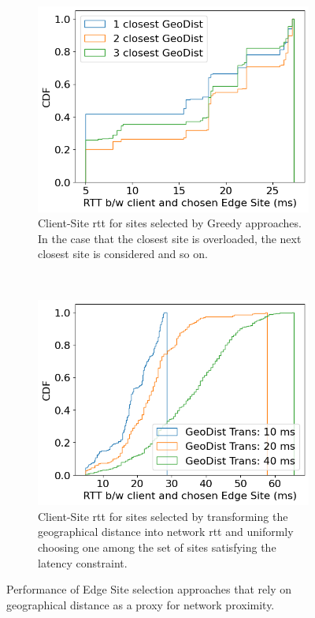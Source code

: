 \begin{figure}[t!]
    \centering
    \begin{subfigure}[t]{0.45\textwidth}
        \centering
        \includegraphics[width=\textwidth]{figures/mechanisms/nw_proximity/geodist_greedy.png}
        \caption{Client-Site \gls{rtt} for sites selected by Greedy approaches. In the case that the closest site is overloaded, the next closest site is considered and so on.}
        \label{fig:geodist_greedy}
    \end{subfigure}%
    ~ 
    \begin{subfigure}[t]{0.45\textwidth}
        \centering
        \includegraphics[width=\textwidth]{figures/mechanisms/nw_proximity/geodist_trans_rtt.png}
        \caption{Client-Site \gls{rtt} for sites selected by transforming the geographical distance into network \gls{rtt} and uniformly choosing one among the set of sites satisfying the latency constraint.}
        \label{fig:geodist_trans}
    \end{subfigure}
    \label{fig:baseline_proximity_policies}
    \caption{Performance of Edge Site selection approaches that rely on geographical distance as a proxy for network proximity.}
\end{figure}

